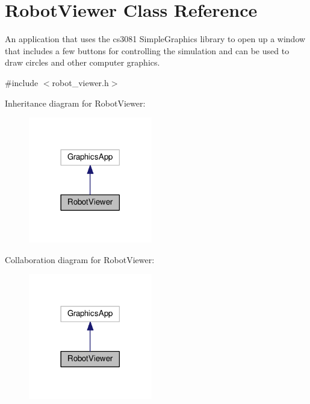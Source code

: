 \hypertarget{classRobotViewer}{}\section{Robot\+Viewer Class Reference}
\label{classRobotViewer}


An application that uses the cs3081 Simple\+Graphics library to open up a window that includes a few buttons for controlling the simulation and can be used to draw circles and other computer graphics.  




{\ttfamily \#include $<$robot\+\_\+viewer.\+h$>$}



Inheritance diagram for Robot\+Viewer\+:\nopagebreak
\begin{figure}[H]
\begin{center}
\leavevmode
\includegraphics[width=153pt]{classRobotViewer__inherit__graph}
\end{center}
\end{figure}


Collaboration diagram for Robot\+Viewer\+:\nopagebreak
\begin{figure}[H]
\begin{center}
\leavevmode
\includegraphics[width=153pt]{classRobotViewer__coll__graph}
\end{center}
\end{figure}
